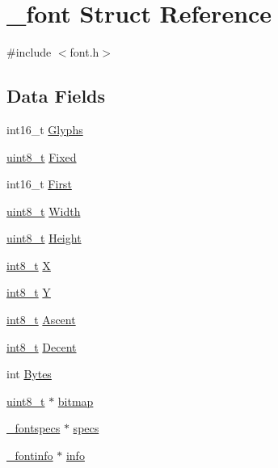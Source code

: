 \hypertarget{struct__font}{\section{\-\_\-font Struct Reference}
\label{struct__font}
}


{\ttfamily \#include $<$font.\-h$>$}

\subsection*{Data Fields}
\begin{DoxyCompactItemize}
\item 
int16\-\_\-t \hyperlink{struct__font_a1e89c06fc11a730eb602522dc8953491}{Glyphs}
\item 
\hyperlink{earth2wireframe_8c_aba7bc1797add20fe3efdf37ced1182c5}{uint8\-\_\-t} \hyperlink{struct__font_a76218c6b35acb78926429f247cbaa687}{Fixed}
\item 
int16\-\_\-t \hyperlink{struct__font_a73decb2a2c2880dc782cd9cda5561876}{First}
\item 
\hyperlink{earth2wireframe_8c_aba7bc1797add20fe3efdf37ced1182c5}{uint8\-\_\-t} \hyperlink{struct__font_ae3d3b48670f1bf4bf6dbf42794f81b31}{Width}
\item 
\hyperlink{earth2wireframe_8c_aba7bc1797add20fe3efdf37ced1182c5}{uint8\-\_\-t} \hyperlink{struct__font_a5888921d1a78bf917351a275e2033467}{Height}
\item 
\hyperlink{earth2wireframe_8c_aef44329758059c91c76d334e8fc09700}{int8\-\_\-t} \hyperlink{struct__font_a64a08fdbdaa19418a9b7a34a2db33150}{X}
\item 
\hyperlink{earth2wireframe_8c_aef44329758059c91c76d334e8fc09700}{int8\-\_\-t} \hyperlink{struct__font_a3c9fee9cfcc713b1aac812c14dd9a36a}{Y}
\item 
\hyperlink{earth2wireframe_8c_aef44329758059c91c76d334e8fc09700}{int8\-\_\-t} \hyperlink{struct__font_a998e54724f56879aa85c5ec169873f39}{Ascent}
\item 
\hyperlink{earth2wireframe_8c_aef44329758059c91c76d334e8fc09700}{int8\-\_\-t} \hyperlink{struct__font_a7f3567884a6aa454b7414b10dba35755}{Decent}
\item 
int \hyperlink{struct__font_a13b0b0e4e91f4d663ba4c3c11bfbda8a}{Bytes}
\item 
\hyperlink{earth2wireframe_8c_aba7bc1797add20fe3efdf37ced1182c5}{uint8\-\_\-t} $\ast$ \hyperlink{struct__font_a336f543c3fe3d3197c6e709fa7df0f5b}{bitmap}
\item 
\hyperlink{struct__fontspecs}{\-\_\-fontspecs} $\ast$ \hyperlink{struct__font_a76b5b07cf75a869627eca27d7a32836a}{specs}
\item 
\hyperlink{struct__fontinfo}{\-\_\-fontinfo} $\ast$ \hyperlink{struct__font_abf134e8a44e707d3b4e83ab76c952ed9}{info}
\end{DoxyCompactItemize}


